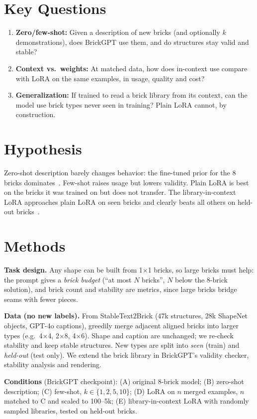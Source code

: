 \documentclass[12pt]{article}
\begin{document}
\section*{Key Questions}
\begin{enumerate}
\item \textbf{Zero/few-shot:} Given a description of new bricks (and optionally $k$ demonstrations), does BrickGPT use them, and do structures stay valid and stable?
\item \textbf{Context vs.\ weights:} At matched data, how does in-context use compare with LoRA on the same examples, in usage, quality and cost?
\item \textbf{Generalization:} If trained to read a brick library from its context, can the model use brick types never seen in training? Plain LoRA cannot, by construction.
\end{enumerate}

\section*{Hypothesis}
Zero-shot description barely changes behavior: the fine-tuned prior for the 8 bricks dominates~\cite{wei2023larger}. Few-shot raises usage but lowers validity. Plain LoRA is best on the bricks it was trained on but does not transfer. The library-in-context LoRA approaches plain LoRA on seen bricks and clearly beats all others on held-out bricks~\cite{lampinen2025generalization}.

\section*{Methods}
\textbf{Task design.} Any shape can be built from 1$\times$1 bricks, so large bricks must help: the prompt gives a \emph{brick budget} (``at most $N$ bricks'', $N$ below the 8-brick solution), and brick count and stability are metrics, since large bricks bridge seams with fewer pieces.

\textbf{Data (no new labels).} From StableText2Brick (47k structures, 28k ShapeNet objects, GPT-4o captions), greedily merge adjacent aligned bricks into larger types (e.g.\ 4$\times$4, 2$\times$8, 4$\times$6). Shape and caption are unchanged; we re-check stability and keep stable structures. New types are split into \emph{seen} (train) and \emph{held-out} (test only). We extend the brick library in BrickGPT's validity checker, stability analysis and rendering.

\textbf{Conditions} (BrickGPT checkpoint): (A) original 8-brick model; (B) zero-shot description; (C) few-shot, $k\in\{1,2,5,10\}$; (D) LoRA on $n$ merged examples, $n$ matched to C and scaled to 100--5k; (E) library-in-context LoRA with randomly sampled libraries, tested on held-out bricks.
\end{document}
